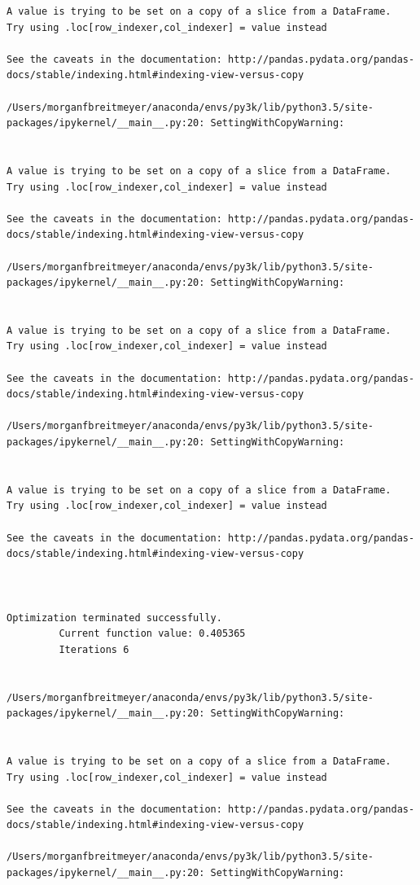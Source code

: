 \begin{lstlisting}
A value is trying to be set on a copy of a slice from a DataFrame.
Try using .loc[row_indexer,col_indexer] = value instead

See the caveats in the documentation: http://pandas.pydata.org/pandas-docs/stable/indexing.html#indexing-view-versus-copy

/Users/morganfbreitmeyer/anaconda/envs/py3k/lib/python3.5/site-packages/ipykernel/__main__.py:20: SettingWithCopyWarning:


A value is trying to be set on a copy of a slice from a DataFrame.
Try using .loc[row_indexer,col_indexer] = value instead

See the caveats in the documentation: http://pandas.pydata.org/pandas-docs/stable/indexing.html#indexing-view-versus-copy

/Users/morganfbreitmeyer/anaconda/envs/py3k/lib/python3.5/site-packages/ipykernel/__main__.py:20: SettingWithCopyWarning:


A value is trying to be set on a copy of a slice from a DataFrame.
Try using .loc[row_indexer,col_indexer] = value instead

See the caveats in the documentation: http://pandas.pydata.org/pandas-docs/stable/indexing.html#indexing-view-versus-copy

/Users/morganfbreitmeyer/anaconda/envs/py3k/lib/python3.5/site-packages/ipykernel/__main__.py:20: SettingWithCopyWarning:


A value is trying to be set on a copy of a slice from a DataFrame.
Try using .loc[row_indexer,col_indexer] = value instead

See the caveats in the documentation: http://pandas.pydata.org/pandas-docs/stable/indexing.html#indexing-view-versus-copy



Optimization terminated successfully.
         Current function value: 0.405365
         Iterations 6


/Users/morganfbreitmeyer/anaconda/envs/py3k/lib/python3.5/site-packages/ipykernel/__main__.py:20: SettingWithCopyWarning:


A value is trying to be set on a copy of a slice from a DataFrame.
Try using .loc[row_indexer,col_indexer] = value instead

See the caveats in the documentation: http://pandas.pydata.org/pandas-docs/stable/indexing.html#indexing-view-versus-copy

/Users/morganfbreitmeyer/anaconda/envs/py3k/lib/python3.5/site-packages/ipykernel/__main__.py:20: SettingWithCopyWarning:



\end{lstlisting}
